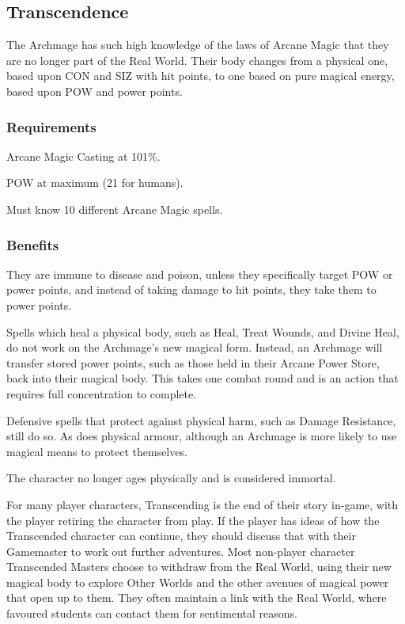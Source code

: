 \subsection{Transcendence}
The Archmage has such high knowledge of the laws of Arcane Magic that they are no longer part of the Real World. Their body changes from a physical one, based upon CON and SIZ with hit points, to one based on pure magical energy, based upon POW and power points.

\subsubsection{Requirements}
\begin{rpg-list}
\item Arcane Magic Casting at 101\%.
\item POW at maximum (21 for humans).
\item Must know 10 different Arcane Magic spells.
\end{rpg-list}

\subsubsection{Benefits}
\begin{rpg-list}
\item They are immune to disease and poison, unless they specifically target POW or power points, and instead of taking damage to hit points, they take them to power points.
\item Spells which heal a physical body, such as Heal, Treat Wounds, and Divine Heal, do not work on the Archmage’s new magical form. Instead, an Archmage will transfer stored power points, such as those held in their Arcane Power Store, back into their magical body. This takes one combat round and is an action that requires full concentration to complete.
\item Defensive spells that protect against physical harm, such as Damage Resistance, still do so. As does physical armour, although an Archmage is more likely to use magical means to protect themselves.
\item The character no longer ages physically and is considered immortal.
\end{rpg-list}

For many player characters, Transcending is the end of their story in-game, with the player retiring the character from play. If the player has ideas of how the Transcended character can continue, they should discuss that with their Gamemaster to work out further adventures. Most non-player character Transcended Masters choose to withdraw from the Real World, using their new magical body to explore Other Worlds and the other avenues of magical power that open up to them. They often maintain a link with the Real World, where favoured students can contact them for sentimental reasons.



